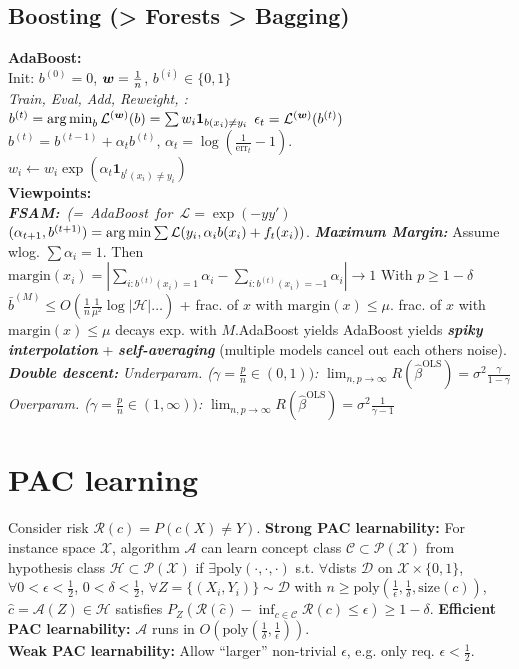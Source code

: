 \subsection*{Boosting (> Forests > Bagging)}
\textbf{AdaBoost:}\\
Init: $b^{(0)}=0$, ${\bm{w}}=\frac{1}{n}$, $b^{(i)}\in\{0,1\}$\\
\emph{Train, Eval, Add, Reweight, {\tiny\CircArrowRight{}}:}\\
$b^{(t)} = \operatorname*{arg\,min}_b \mathcal{L}^{({\bm{w}})}(b)=\sum w_i\mathbf{1}_{b(x_i)\neq y_i}$
$\epsilon_t=\mathcal{L}^{({\bm{w}})}(b^{(t)})$\\
$b^{(t)} = b^{(t-1)} + \alpha_t b^{(t)}$, $\alpha_t = \log(\frac{1}{\mathrm{err}_t}-1)$.\\
$w_i \leftarrow w_i\exp(\alpha_t\mathbf{1}_{b^{t}(x_i) \neq y_i})$\\
\textbf{Viewpoints:}\\
\mbox{\emph{\textbf{FSAM:}} \emph{(= AdaBoost for $\mathcal{L}=\exp(-yy')$}}
$(\alpha_{t+1}, b^{(t+1)}) = \operatorname*{arg\,min}\sum\mathcal{L}(y_i, \alpha_i b(x_i) + f_t(x_i))$.
\emph{\textbf{Maximum Margin:}} Assume wlog. $\sum \alpha_i = 1$. Then $\mathrm{margin}(x_i)=|\sum_{i:b^{(t)}(x_i)=1}\alpha_i - \sum_{i:b^{(t)}(x_i)=-1}\alpha_i| \to 1$
With $p\geq 1-\delta$ $\bar{b}^{(M)} \leq O(\frac{1}{n}\frac{1}{\mu^2}\log|\mathcal{H}|\ldots)$ + frac. of $x$ with $\mathrm{margin}(x) \leq \mu$. frac. of $x$ with $\mathrm{margin}(x) \leq \mu$ decays exp. with $M$.AdaBoost yields AdaBoost yields 
\emph{\textbf{spiky interpolation}} + \emph{\textbf{self-averaging}} (multiple models cancel out each others noise). \emph{\textbf{Double descent:}} \emph{Underparam. ($\gamma = \frac{p}{n}\in(0,1))$:} $\lim_{n,p\to\infty} R(\hat{\beta}^{\mathrm{OLS}}) = \sigma^2\frac{\gamma}{1-\gamma}$ \emph{Overparam. ($\gamma = \frac{p}{n}\in(1,\infty))$:} $\lim_{n,p\to\infty} R(\hat{\beta}^{\mathrm{OLS}}) = \sigma^2\frac{1}{\gamma-1}$ 

\section*{PAC learning}
Consider risk $\mathcal{R}(c) = P(c(X)\neq Y)$.
\textbf{Strong PAC learnability:}
For instance space $\mathcal{X}$, algorithm $\mathcal{A}$ can learn concept class
$\mathcal{C}\subset\mathcal{P}(\mathcal{X})$ from hypothesis class $\mathcal{H}\subset\mathcal{P}(\mathcal{X})$ if $\exists\mathrm{poly}(\cdot,\cdot,\cdot)$ s.t.
$\forall$dists $\mathcal{D}$ on $\mathcal{X}\times\{0,1\}$, $\forall 0<\epsilon<\frac{1}{2}$, $0<\delta<\frac{1}{2}$, $\forall Z=\{(X_i,Y_i)\}\sim\mathcal{D}$ with $n\geq\mathrm{poly}(\frac{1}{\epsilon},\frac{1}{\delta},\mathrm{size}(c))$, $\hat{c} = \mathcal{A}(Z)\in\mathcal{H}$ satisfies $P_Z(\mathcal{R}(\hat{c})-\inf_{c\in\mathcal{C}}\mathcal{R}(c)\leq\epsilon) \geq 1-\delta$.
\textbf{Efficient PAC learnability:} $\mathcal{A}$ runs in $O(\mathrm{poly}(\frac{1}{\delta},\frac{1}{\epsilon}))$.\\
\textbf{Weak PAC learnability:} Allow ``larger'' non-trivial $\epsilon$, e.g. only req. $\epsilon < \frac{1}{2}$.

